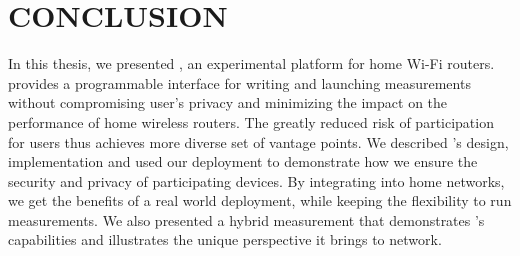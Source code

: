 \chapter{CONCLUSION}
\label{sec.conclusion}
In this thesis, we presented \sysname, an experimental platform for home Wi-Fi routers. \sysname provides a programmable interface for writing and launching measurements without compromising user's privacy and minimizing the impact on the performance of home wireless routers. The greatly reduced risk of participation for users thus achieves more diverse set of vantage points. We described \sysname's design, implementation and used our deployment to demonstrate how we ensure the security and privacy of participating devices. By integrating \sysname into home networks, we get the benefits of a real world deployment, while keeping the flexibility to run measurements. We also presented a hybrid measurement that demonstrates \sysname's capabilities and illustrates the unique perspective it brings to network. 